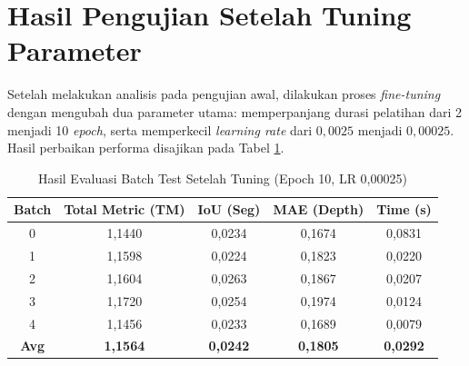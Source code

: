 \documentclass[12pt, a4paper]{article}
\begin{document}
\section{Hasil Pengujian Setelah Tuning Parameter}

Setelah melakukan analisis pada pengujian awal, dilakukan proses \textit{fine-tuning} dengan mengubah dua parameter utama: memperpanjang durasi pelatihan dari 2 menjadi 10 \textit{epoch}, serta memperkecil \textit{learning rate} dari $0,0025$ menjadi $0,00025$. Hasil perbaikan performa disajikan pada Tabel \ref{tab:test_results_tuned}.

\begin{table}[h]
    \centering
    \caption{Hasil Evaluasi Batch Test Setelah Tuning (Epoch 10, LR 0,00025)}
    \label{tab:test_results_tuned}
    \begin{tabular}{|c|c|c|c|c|}
        \hline
        \textbf{Batch} & \textbf{Total Metric (TM)} & \textbf{IoU (Seg)} & \textbf{MAE (Depth)} & \textbf{Time (s)} \\ \hline
        0              & 1,1440                     & 0,0234             & 0,1674               & 0,0831            \\ \hline
        1              & 1,1598                     & 0,0224             & 0,1823               & 0,0220            \\ \hline
        2              & 1,1604                     & 0,0263             & 0,1867               & 0,0207            \\ \hline
        3              & 1,1720                     & 0,0254             & 0,1974               & 0,0124            \\ \hline
        4              & 1,1456                     & 0,0233             & 0,1689               & 0,0079            \\ \hline
        \textbf{Avg}   & \textbf{1,1564}            & \textbf{0,0242}    & \textbf{0,1805}      & \textbf{0,0292}   \\ \hline
    \end{tabular}
\end{table}
\end{document}
